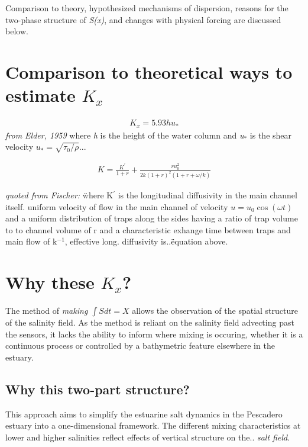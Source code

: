 Comparison to theory, hypothesized mechanisms of dispersion, reasons for the two-phase structure of \emph{S(x)}, and changes with physical forcing are discussed below. 

\section{Comparison to theoretical ways to estimate $K_x$}

\begin{eqnarray}
K_x = 5.93hu_* \label{eq:Kshear}
\end{eqnarray}
\emph{from Elder, 1959} where \emph{h} is the height of the water column and \emph{u$_*$} is the shear velocity $u_*=\sqrt{\tau_0/\rho}$... 


\begin{eqnarray}
K = \frac{K^{'}}{1+r} + \frac{ru_0^2}{2k(1+r)^2(1+r+\omega / k)} \label{eq:KxOkubo}
\end{eqnarray}

\emph{quoted from Fischer:} \"where K$^{'}$ is the longitudinal diffusivity in the main channel itself. uniform velocity of flow in the main channel of velocity $u = u_0 \cos(\omega t)$ and a uniform distribution of traps along the sides having a ratio of trap volume to to channel volume of r and a characteristic exhange time between traps and main flow of k$^{-1}$, effective long. diffusivity is..\" equation above. 


\section{Why these $K_x$?}

The method of \emph{making $\int{S}dt = X$} allows the observation of the spatial structure of the salinity field.  As the method is reliant on the salinity field advecting past the sensors, it lacks the ability to inform where mixing is occuring, whether it is a continuous process or controlled by a bathymetric feature elsewhere in the estuary. 

\subsection{Why this two-part structure?}

This approach aims to simplify the estuarine salt dynamics in the Pescadero estuary into a one-dimensional framework. The different mixing characteristics at lower and higher salinities reflect effects of vertical structure on the.. \emph{salt field}. 

